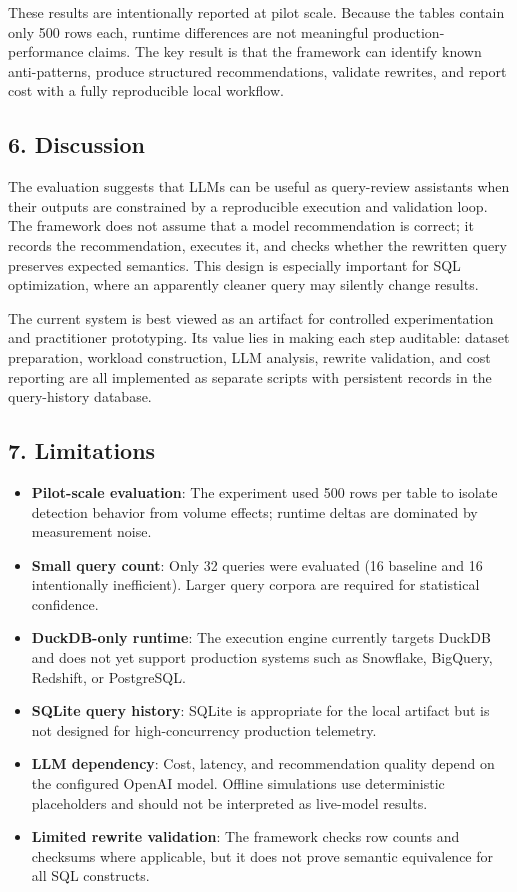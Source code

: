 These results are intentionally reported at pilot scale. Because the
tables contain only 500 rows each, runtime differences are not meaningful
production-performance claims. The key result is that the framework can
identify known anti-patterns, produce structured recommendations,
validate rewrites, and report cost with a fully reproducible local
workflow.

\subsection{6. Discussion}\label{discussion}

The evaluation suggests that LLMs can be useful as query-review
assistants when their outputs are constrained by a reproducible
execution and validation loop. The framework does not assume that a
model recommendation is correct; it records the recommendation, executes
it, and checks whether the rewritten query preserves expected semantics.
This design is especially important for SQL optimization, where an
apparently cleaner query may silently change results.

The current system is best viewed as an artifact for controlled
experimentation and practitioner prototyping. Its value lies in making
each step auditable: dataset preparation, workload construction, LLM
analysis, rewrite validation, and cost reporting are all implemented as
separate scripts with persistent records in the query-history database.

\subsection{7. Limitations}\label{limitations}

\begin{itemize}
\tightlist
\item
  \textbf{Pilot-scale evaluation}: The experiment used 500 rows per table
  to isolate detection behavior from volume effects; runtime
  deltas are dominated by measurement noise.
\item
  \textbf{Small query count}: Only 32 queries were evaluated (16 baseline
  and 16 intentionally inefficient). Larger query corpora are required
  for statistical confidence.
\item
  \textbf{DuckDB-only runtime}: The execution engine currently targets
  DuckDB and does not yet support production systems such as Snowflake,
  BigQuery, Redshift, or PostgreSQL.
\item
  \textbf{SQLite query history}: SQLite is appropriate for the local
  artifact but is not designed for high-concurrency production
  telemetry.
\item
  \textbf{LLM dependency}: Cost, latency, and recommendation quality
  depend on the configured OpenAI model. Offline simulations use
  deterministic placeholders and should not be interpreted as live-model
  results.
\item
  \textbf{Limited rewrite validation}: The framework checks row counts
  and checksums where applicable, but it does not prove semantic
  equivalence for all SQL constructs.
\end{itemize}

